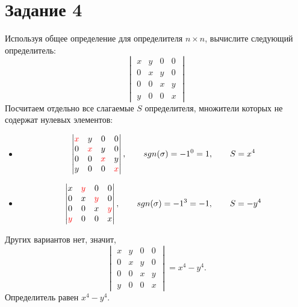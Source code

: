 \documentclass[a4paper,12pt]{article}
\begin{document}
\section*{Задание 4}
Используя общее определение для определителя $n \times n$, вычислите следующий определитель:
\[ 
\begin{vmatrix}
x & y & 0 & 0\\
0 & x & y & 0\\
0 & 0 & x & y\\
y & 0 & 0 & x
\end{vmatrix}
\]
 Посчитаем отдельно все слагаемые $S$ определителя, множители которых не содержат нулевых элементов:
\begin{itemize}
\item 
$$
\begin{vmatrix}
\textcolor{red}{x} & y & 0 & 0\\
0 & \textcolor{red}{x} & y & 0\\
0 & 0 & \textcolor{red}{x} & y\\
y & 0 & 0 & \textcolor{red}{x}
\end{vmatrix}, \qquad
sgn (\sigma) = -1^0 = 1, \qquad
S = x^4$$

\item 
$$
\begin{vmatrix}
x & \textcolor{red}{y} & 0 & 0\\
0 & x & \textcolor{red}{y} & 0\\
0 & 0 & x & \textcolor{red}{y}\\
\textcolor{red}{y} & 0 & 0 & x
\end{vmatrix}, \qquad
sgn (\sigma) = -1^3 = -1, \qquad
S = -y^4$$
\end{itemize}
Других вариантов нет, значит, 
\[ 
\begin{vmatrix}
x & y & 0 & 0\\
0 & x & y & 0\\
0 & 0 & x & y\\
y & 0 & 0 & x
\end{vmatrix} = x^4-y^4.
\]
 Определитель равен $x^4-y^4$.
\end{document}

